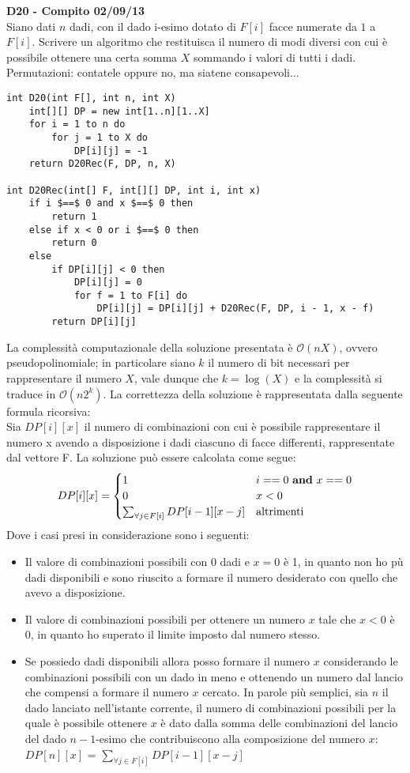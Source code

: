 \documentclass[../cheatSheetAlgoritmi.tex]{subfiles}
\begin{document}
\bigskip
\textbf{D20 - Compito 02/09/13}\\
Siano dati $n$ dadi, con il dado i-esimo dotato di $F[i]$ facce numerate da $1$ a $F[i]$. Scrivere un algoritmo che restituisca il numero di modi diversi con cui è possibile ottenere una certa somma $X$ sommando i valori di tutti i dadi. Permutazioni: contatele oppure no, ma siatene consapevoli...
\begin{lstlisting}[caption= D20 con permutazioni]
int D20(int F[], int n, int X)
    int[][] DP = new int[1..n][1..X]
    for i = 1 to n do
        for j = 1 to X do
            DP[i][j] = -1
    return D20Rec(F, DP, n, X)

int D20Rec(int[] F, int[][] DP, int i, int x)
    if i $==$ 0 and x $==$ 0 then
        return 1
    else if x < 0 or i $==$ 0 then
        return 0
    else
        if DP[i][j] < 0 then
            DP[i][j] = 0
            for f = 1 to F[i] do
                DP[i][j] = DP[i][j] + D20Rec(F, DP, i - 1, x - f)
        return DP[i][j]
\end{lstlisting}
La complessità computazionale della soluzione presentata è $\mathcal{O}(nX)$, ovvero pseudopolinomiale; in particolare siano $k$ il numero di bit necessari per rappresentare il numero $X$, vale dunque che $k = \log(X)$ e la complessità si traduce in $\mathcal{O}(n2^k)$. 
La correttezza della soluzione è rappresentata dalla seguente formula ricorsiva: \\
Sia $DP[i][x]$ il numero di combinazioni con cui è possibile rappresentare il numero x avendo a disposizione i dadi ciascuno di facce differenti, rappresentate dal vettore F. La soluzione può essere calcolata come segue:
\begin{equation*}
    DP[i][x]=\begin{cases}
        1 & \text{$i == 0$ \textbf{and} $x == 0$}\\
        0 & \text{$x < 0$} \\
        \sum_{\forall j \in F[i]} DP[i-1][x - j] & \text{altrimenti}
    \end{cases}
\end{equation*}
Dove i casi presi in considerazione sono i seguenti:
\begin{itemize}
    \item Il valore di combinazioni possibili con 0 dadi e $x = 0$ è 1, in quanto non ho pù dadi disponibili e sono riuscito a formare il numero desiderato con quello che avevo a disposizione.
    \item Il valore di combinazioni possibili per ottenere un numero $x$ tale che $x < 0$ è 0, in quanto ho superato il limite imposto dal numero stesso.
    \item Se possiedo dadi disponibili allora posso formare il numero $x$ considerando le combinazioni possibili con un dado in meno e ottenendo un numero dal lancio che compensi a formare il numero $x$ cercato. In parole più semplici, sia $n$ il dado lanciato nell'istante corrente, il numero di combinazioni possibili per la quale è possibile ottenere $x$ è dato dalla somma delle combinazioni del lancio del dado $n-1$-esimo che contribuiscono alla composizione del numero $x$:
    $DP[n][x]$ = $\sum_{\forall j \in F[i]} DP[i-1][x - j]$
\end{itemize}
\end{document}
